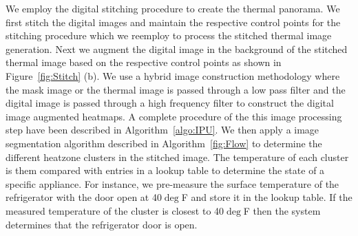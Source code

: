 
We employ the digital stitching procedure to create the thermal panorama. We first stitch the digital images and maintain the respective control points for the stitching procedure which we reemploy to process the stitched thermal image generation. Next we augment the digital image in the background of the stitched thermal image based on the respective control points as shown in Figure~\ref{fig:Stitch} (b). We use a hybrid image construction methodology where the mask image or the thermal image is passed through a low pass filter and the digital image is passed through a high frequency filter to construct the digital image augmented heatmaps. A complete procedure of the this image processing step have been described in Algorithm~\ref{algo:IPU}. We then apply a image segmentation algorithm described in Algorithm~\ref{fig:Flow} to determine the different heatzone
clusters in the stitched image. The temperature of each cluster is them compared with entries in a lookup table to determine the state of
a specific appliance. For instance, we pre-measure the surface temperature of the refrigerator with the door open at 40$\deg$F and store it in the lookup table. If the measured temperature of the cluster is closest to 40$\deg$F then the system determines that the refrigerator door is open.


